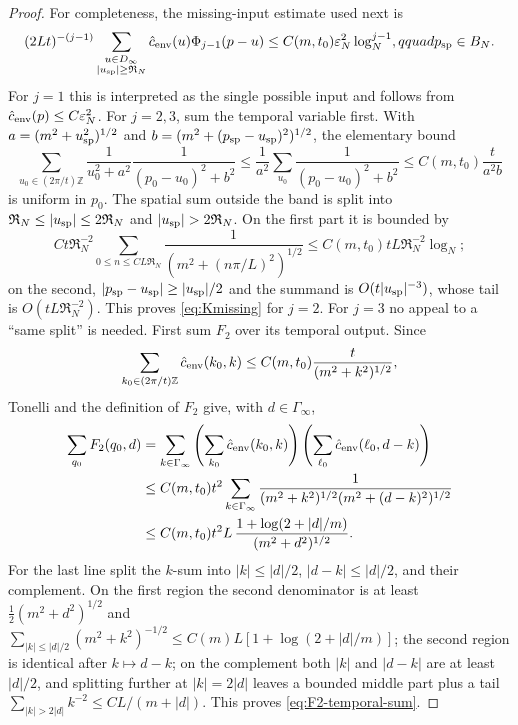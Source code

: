 \documentclass[11pt,a4paper]{article}
\theoremstyle{plain}
\theoremstyle{definition}
\newcommand{\Z}{\mathbb{Z}}
\newcommand{\eps}{\varepsilon}
\begin{document}
\begin{proof}
For completeness, the missing-input estimate used next is
\begin{equation}
 (2Lt)^{-(j-1)}
 \sum_{\substack{u\in D_\infty\\|u_{\rm sp}|\ge\mathfrak R_N}}
 \hat c_{\rm env}(u)\Phi_{j-1}(p-u)
 \le C(m,t_0)\eps_N^2\log_N^{j-1},qquad p_{\rm sp}\in B_N.           \label{eq:Kmissing}
\end{equation}
For $j=1$ this is interpreted as the single possible input and follows from
$\hat c_{\rm env}(p)\le C\eps_N^2$.  For $j=2,3$, sum the temporal
variable first.  With
$a=(m^2+u_{\rm sp}^2)^{1/2}$ and
$b=(m^2+(p_{\rm sp}-u_{\rm sp})^2)^{1/2}$, the elementary bound
\[
 \sum_{u_0\in(2\pi/t)\Z}
 \frac1{u_0^2+a^2}\frac1{(p_0-u_0)^2+b^2}
 \le\frac1{a^2}\sum_{u_0}\frac1{(p_0-u_0)^2+b^2}
 \le C(m,t_0)\frac{t}{a^2b}
\]
is uniform in $p_0$.  The spatial sum outside the band is split into
$\mathfrak R_N\le|u_{\rm sp}|\le2\mathfrak R_N$ and
$|u_{\rm sp}|>2\mathfrak R_N$.  On the first part it is bounded by
\[
 C t\mathfrak R_N^{-2}
 \sum_{0\le n\le C L\mathfrak R_N}
       \frac1{(m^2+(n\pi/L)^2)^{1/2}}
 \le C(m,t_0)tL\mathfrak R_N^{-2}\log_N;
\]
on the second, $|p_{\rm sp}-u_{\rm sp}|\ge|u_{\rm sp}|/2$ and the
summand is $O(t|u_{\rm sp}|^{-3})$, whose tail is
$O(tL\mathfrak R_N^{-2})$.  This proves \eqref{eq:Kmissing} for $j=2$.
For $j=3$ no appeal to a ``same split'' is needed.  First sum $F_2$ over
its temporal output.  Since
\[
 \sum_{k_0\in(2\pi/t)\Z}\hat c_{\rm env}(k_0,k)
 \le C(m,t_0)\frac{t}{(m^2+k^2)^{1/2}},
\]
Tonelli and the definition of $F_2$ give, with $d\in\Gamma_\infty$,
\begin{align}
 \sum_{q_0}F_2(q_0,d)
 &=\sum_{k\in\Gamma_\infty}
   \left(\sum_{k_0}\hat c_{\rm env}(k_0,k)\right)
   \left(\sum_{\ell_0}\hat c_{\rm env}(\ell_0,d-k)\right)\\
 &\le C(m,t_0)t^2
   \sum_{k\in\Gamma_\infty}
   \frac1{(m^2+k^2)^{1/2}(m^2+(d-k)^2)^{1/2}}\\
 &\le C(m,t_0)t^2L\,
   \frac{1+\log(2+|d|/m)}{(m^2+d^2)^{1/2}}.                       \label{eq:F2-temporal-sum}
\end{align}
For the last line split the $k$-sum into
$|k|\le|d|/2$, $|d-k|\le|d|/2$, and their complement.  On the first
region the second denominator is at least
$\frac12(m^2+d^2)^{1/2}$ and
$\sum_{|k|\le|d|/2}(m^2+k^2)^{-1/2}\le
C(m)L[1+\log(2+|d|/m)]$; the second region is identical after
$k\mapsto d-k$; on the complement both $|k|$ and $|d-k|$ are at least
$|d|/2$, and splitting further at $|k|=2|d|$ leaves a bounded middle
part plus a tail $\sum_{|k|>2|d|}k^{-2}\le CL/(m+|d|)$.  This proves
\eqref{eq:F2-temporal-sum}.


\end{proof}
\end{document}
